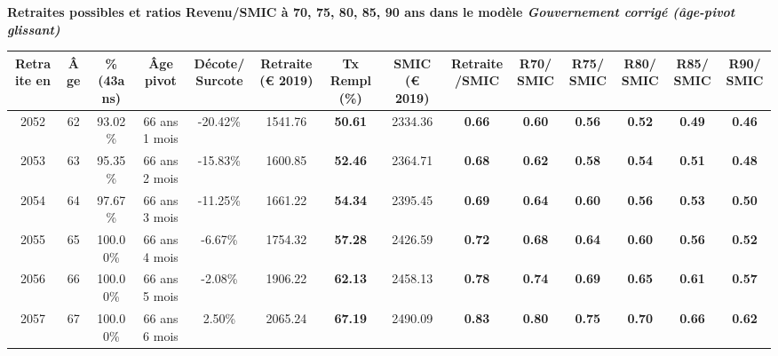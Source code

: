  \vspace{0.1cm} 
{\bf \noindent Retraites possibles et ratios Revenu/SMIC à 70, 75, 80, 85, 90 ans dans le modèle \emph{Gouvernement corrigé (âge-pivot glissant)}}  
 
\begin{adjustbox}{max width=\textwidth} 
\begin{tabular}[htb]{|c|c||c|c|c||c|c||c|c||c|c|c|c|c|} 
\hline 
 Retraite en &  Âge &  \%(43ans) &  Âge pivot &  Décote/Surcote &  Retraite (\euro{} 2019) &  Tx Rempl(\%) &  SMIC (\euro{} 2019) &  Retraite/SMIC &  R70/SMIC &  R75/SMIC &  R80/SMIC &  R85/SMIC &  R90/SMIC \\ 
\hline \hline 
 2052 &  62 &  93.02\% &  66 ans 1 mois &  -20.42\% &  1541.76 &  {\bf 50.61} &  2334.36 &  {\bf {\color{red} 0.66}} &  {\bf {\color{red} 0.60}} &  {\bf {\color{red} 0.56}} &  {\bf {\color{red} 0.52}} &  {\bf {\color{red} 0.49}} &  {\bf {\color{red} 0.46}} \\ 
\hline 
 2053 &  63 &  95.35\% &  66 ans 2 mois &  -15.83\% &  1600.85 &  {\bf 52.46} &  2364.71 &  {\bf {\color{red} 0.68}} &  {\bf {\color{red} 0.62}} &  {\bf {\color{red} 0.58}} &  {\bf {\color{red} 0.54}} &  {\bf {\color{red} 0.51}} &  {\bf {\color{red} 0.48}} \\ 
\hline 
 2054 &  64 &  97.67\% &  66 ans 3 mois &  -11.25\% &  1661.22 &  {\bf 54.34} &  2395.45 &  {\bf {\color{red} 0.69}} &  {\bf {\color{red} 0.64}} &  {\bf {\color{red} 0.60}} &  {\bf {\color{red} 0.56}} &  {\bf {\color{red} 0.53}} &  {\bf {\color{red} 0.50}} \\ 
\hline 
 2055 &  65 &  100.00\% &  66 ans 4 mois &  -6.67\% &  1754.32 &  {\bf 57.28} &  2426.59 &  {\bf {\color{red} 0.72}} &  {\bf {\color{red} 0.68}} &  {\bf {\color{red} 0.64}} &  {\bf {\color{red} 0.60}} &  {\bf {\color{red} 0.56}} &  {\bf {\color{red} 0.52}} \\ 
\hline 
 2056 &  66 &  100.00\% &  66 ans 5 mois &  -2.08\% &  1906.22 &  {\bf 62.13} &  2458.13 &  {\bf {\color{red} 0.78}} &  {\bf {\color{red} 0.74}} &  {\bf {\color{red} 0.69}} &  {\bf {\color{red} 0.65}} &  {\bf {\color{red} 0.61}} &  {\bf {\color{red} 0.57}} \\ 
\hline 
 2057 &  67 &  100.00\% &  66 ans 6 mois &  2.50\% &  2065.24 &  {\bf 67.19} &  2490.09 &  {\bf {\color{red} 0.83}} &  {\bf {\color{red} 0.80}} &  {\bf {\color{red} 0.75}} &  {\bf {\color{red} 0.70}} &  {\bf {\color{red} 0.66}} &  {\bf {\color{red} 0.62}} \\ 
\hline 
\hline 
\end{tabular} 
\end{adjustbox} 
 
